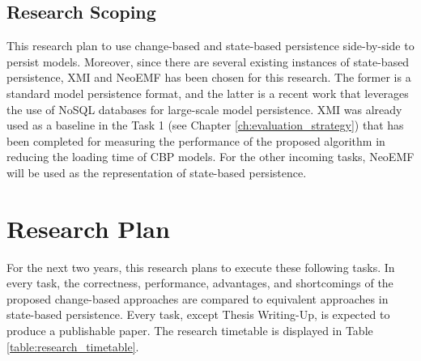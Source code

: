 \documentclass[12pt, a4paper]{report} \usepackage[titletoc]{appendix}
\begin{document}
\section{Research Scoping}
\label{sec:research_scoping}
This research plan to use change-based and state-based persistence side-by-side to persist models. Moreover, since there are several existing instances of state-based persistence, XMI and NeoEMF \cite{daniel2016neoemf} has been chosen for this research. The former is a standard model persistence format, and the latter is a recent work that leverages the use of NoSQL databases for large-scale model persistence. XMI was already used as a baseline in the Task 1 (see Chapter \ref{ch:evaluation_strategy}) that has been completed for measuring the performance of the proposed algorithm in reducing the loading time of CBP models. For the other incoming tasks, NeoEMF will be used as the representation of state-based persistence.

\chapter{Research Plan}
\label{ch:research_plan}
For the next two years, this research plans to execute these following tasks. In every task, the correctness, performance, advantages, and shortcomings of the proposed change-based approaches are compared to equivalent approaches in state-based persistence. Every task, except Thesis Writing-Up, is expected to produce a publishable paper. The research timetable is displayed in Table \ref{table:research_timetable}.
\end{document}
